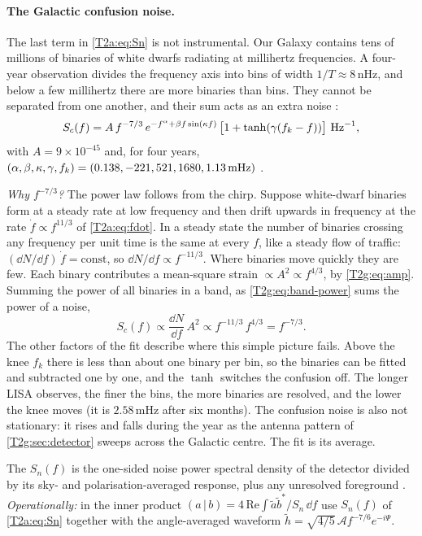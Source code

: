 \paragraph{The Galactic confusion noise.}
The last term in \eqref{T2a:eq:Sn} is not instrumental. Our Galaxy contains tens of millions of binaries of white dwarfs radiating at millihertz frequencies. A four-year observation divides the frequency axis into bins of width $1/T\approx8$\,nHz, and below a few millihertz there are more binaries than bins. They cannot be separated from one another, and their sum acts as an extra noise \cite[Sec.~1]{Robson2019}:
\begin{equation}
  S_c(f)=A\,f^{-7/3}\,e^{-f^{\alpha}+\beta f\sin(\kappa f)}\,\big[1+\tanh(\gamma(f_k-f))\big]\ {\rm Hz}^{-1},
\end{equation}
with $A=9\times10^{-45}$ and, for four years, $(\alpha,\beta,\kappa,\gamma,f_k)=(0.138,-221,521,1680,1.13\,{\rm mHz})$ \cite[eq.~(14)]{Robson2019}.

\emph{Why $f^{-7/3}$?} The power law follows from the chirp. Suppose white-dwarf binaries form at a steady rate at low frequency and then drift upwards in frequency at the rate $\dot f\propto f^{11/3}$ of \eqref{T2a:eq:fdot}. In a steady state the number of binaries crossing any frequency per unit time is the same at every $f$, like a steady flow of traffic: $(\dd N/\dd f)\,\dot f=\text{const}$, so $\dd N/\dd f\propto f^{-11/3}$. Where binaries move quickly they are few. Each binary contributes a mean-square strain $\propto A^2\propto f^{4/3}$, by \eqref{T2g:eq:amp}. Summing the power of all binaries in a band, as \eqref{T2g:eq:band-power} sums the power of a noise,
\begin{equation}
  S_c(f)\propto\frac{\dd N}{\dd f}\,A^2\propto f^{-11/3}\,f^{4/3}=f^{-7/3}.
\end{equation}
The other factors of the fit describe where this simple picture fails. Above the knee $f_k$ there is less than about one binary per bin, so the binaries can be fitted and subtracted one by one, and the $\tanh$ switches the confusion off. The longer LISA observes, the finer the bins, the more binaries are resolved, and the lower the knee moves (it is $2.58$\,mHz after six months). The confusion noise is also not stationary: it rises and falls during the year as the antenna pattern of \cref{T2g:sec:detector} sweeps across the Galactic centre. The fit is its average.

\begin{workdef}
The  $S_n(f)$ is the one-sided noise power spectral density of the detector divided by its sky- and polarisation-averaged response, plus any unresolved foreground . \emph{Operationally:} in the inner product $(a\,|\,b)=4\,\mathrm{Re}\int\tilde a\tilde b^*/S_n\,\dd f$ use $S_n(f)$ of \eqref{T2a:eq:Sn} together with the angle-averaged waveform $\tilde h=\sqrt{4/5}\,\mathcal Af^{-7/6}e^{-i\Psi}$.
\end{workdef}


